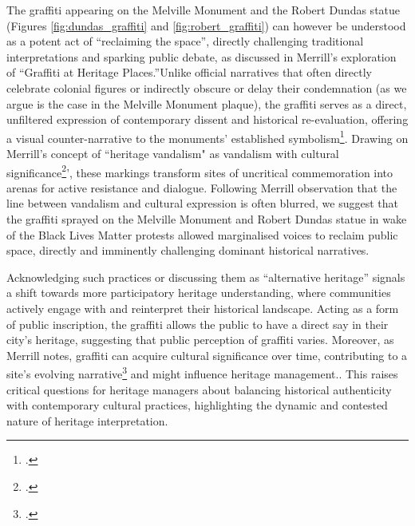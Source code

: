 \documentclass{scrartcl}
\begin{document}
The graffiti appearing on the Melville Monument and the Robert Dundas statue (Figures \ref{fig:dundas_graffiti} and \ref{fig:robert_graffiti}) can however be understood as a potent act of ``reclaiming the space'', directly challenging traditional interpretations and sparking public debate, as discussed in Merrill's exploration of ``Graffiti at Heritage Places.''Unlike official narratives that often directly celebrate colonial figures or indirectly obscure or delay their condemnation (as we argue is the case in the Melville Monument plaque), the graffiti serves as a direct, unfiltered expression of contemporary dissent and historical re-evaluation, offering a visual counter-narrative to the monuments' established symbolism\footcite["The reason for this juxtaposition lies in the politicized nature of heritage and its role in the construction of identity and “the Other.” When “the Other” is defined as “groups—both internal and external to a state with competing often conflicting, beliefs, values and aspirations,” the position of vandals and graffiti artists becomes clear (Graham et al. 2005: 30). They are easily identifiable as an internal “Other,” who conflict with the identifiable and acceptable norms of the state, and as such represent Klossowski’s “criminal culture” (2005: 7). "][p.70]{merrill_2011}. Drawing on Merrill's concept of ``heritage vandalism" as vandalism with cultural significance\footcite["Therefore, it can be argued that some examples of graffiti represent heritage on their artistic merit and also due to the academic and cultural significance they embody as mirrors of contemporary society." 
][p.63]{merrill_2011}', these markings transform sites of uncritical commemoration into arenas for active resistance and dialogue. Following Merrill observation that the line between vandalism and cultural expression is often blurred, we suggest that the graffiti sprayed on the Melville Monument and Robert Dundas statue in wake of the Black Lives Matter protests allowed marginalised voices to reclaim public space, directly and imminently challenging dominant historical narratives. 

Acknowledging such practices or discussing them as ``alternative heritage'' signals a shift towards more participatory heritage understanding, where communities actively engage with and reinterpret their historical landscape. Acting as a form of public inscription, the graffiti allows the public to have a direct say in their city's heritage, suggesting that public perception of graffiti varies. Moreover, as Merrill notes, graffiti can acquire cultural significance over time, contributing to a site's evolving narrative\footcite["These perspectives would suggest that graffiti as a form of vandalism should be recognized as one of a site’s many layers of history, which for some represent the outward manifestation of their culture and embody cultural significance. 
][p.69]{merrill_2011} and might influence heritage management.. This raises critical questions for heritage managers about balancing historical authenticity with contemporary cultural practices, highlighting the dynamic and contested nature of heritage interpretation.
\end{document}
